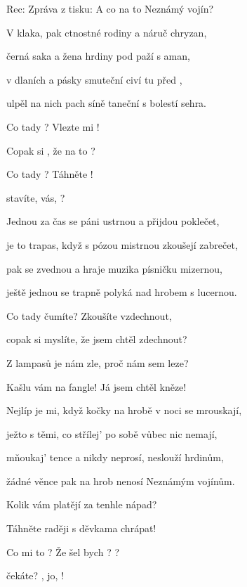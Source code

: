 

Rec: Zpráva z tisku:  A co na to Neznámý vojín?

\zs
V  klaka, pak ctnostné rodiny a náruč chryzan,

černá saka a žena hrdiny pod paží s aman,

 v dlaních a pásky smuteční civí tu před ,

ulpěl na nich pach síně taneční s bolestí sehra.
\ks

\zr
Co tady ? Vlezte mi !

Copak si , že na to ?

Co tady ? Táhněte !

 stavíte,  vás, ?  
\kr

\zs
Jednou za čas se páni ustrnou a přijdou poklečet,

je to trapas, když s pózou mistrnou zkoušejí zabrečet,

pak se zvednou a hraje muzika písničku mizernou,

ještě jednou se trapně polyká nad hrobem s lucernou.
\ks

\zr
Co tady čumíte? Zkoušíte vzdechnout,

copak si myslíte, že jsem chtěl zdechnout?

Z lampasů je nám zle, proč nám sem leze?

Kašlu vám na fangle! Já jsem chtěl kněze!
\kr

\zs
Nejlíp je mi, když kočky na hrobě v noci se mrouskají,

ježto s těmi, co střílej' po sobě vůbec nic nemají,

mňoukaj' tence a nikdy neprosí, neslouží hrdinům,

žádné věnce pak na hrob nenosí Neznámým vojínům.

Kolik vám platějí za tenhle nápad?

Táhněte raději s děvkama chrápat!
\ks

\zr
Co mi to ? Že šel bych ? ?

 čekáte? , jo, !  
\kr

\kp






